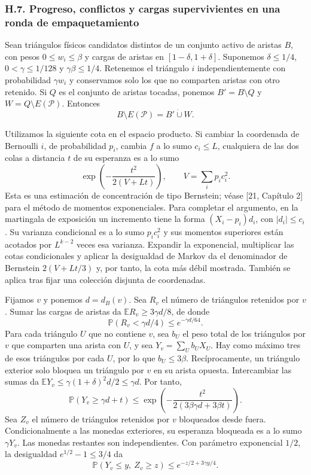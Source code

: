 \documentclass[spanish,11pt,a4paper]{article}
\begin{document}
\subsubsection{H.7. Progreso, conflictos y cargas supervivientes en una ronda de empaquetamiento}\label{h.7.-progreso-conflictos-y-cargas-supervivientes-en-una-ronda-de-empaquetamiento}

Sean triángulos físicos candidatos distintos de un conjunto activo de aristas \(B\), con pesos \(0\le w_i\le\beta\) y cargas de aristas en \([1-\delta,1+\delta]\). Suponemos \(\delta\le1/4\), \(0<\gamma\le1/128\) y \(\gamma\beta\le1/4\). Retenemos el triángulo \(i\) independientemente con probabilidad \(\gamma w_i\) y conservamos solo los que no comparten aristas con otro retenido. Si \(Q\) es el conjunto de aristas tocadas, ponemos \(B'=B\setminus Q\) y \(W=Q\setminus E(\mathcal P)\). Entonces \[B\setminus E(\mathcal P)=B'\mathbin{\dot\cup}W.\]

Utilizamos la siguiente cota en el espacio producto. Si cambiar la coordenada de Bernoulli \(i\), de probabilidad \(p_i\), cambia \(f\) a lo sumo \(c_i\le L\), cualquiera de las dos colas a distancia \(t\) de su esperanza es a lo sumo \[\exp\left(-\frac{t^2}{2(V+Lt)}\right),\qquad V=\sum_i p_ic_i^2.\] Esta es una estimación de concentración de tipo Bernstein; véase {[}21, Capítulo 2{]} para el método de momentos exponenciales. Para completar el argumento, en la martingala de exposición un incremento tiene la forma \((X_i-p_i)d_i\), con \(|d_i|\le c_i\). Su varianza condicional es a lo sumo \(p_ic_i^2\) y sus momentos superiores están acotados por \(L^{k-2}\) veces esa varianza. Expandir la exponencial, multiplicar las cotas condicionales y aplicar la desigualdad de Markov da el denominador de Bernstein \(2(V+Lt/3)\) y, por tanto, la cota más débil mostrada. También se aplica tras fijar una colección disjunta de coordenadas.

Fijamos \(v\) y ponemos \(d=d_B(v)\). Sea \(R_v\) el número de triángulos retenidos por \(v\). Sumar las cargas de aristas da \(\mathbb ER_v\ge3\gamma d/8\), de donde \[\mathbb P(R_v<\gamma d/4)\le e^{-\gamma d/64}.\] Para cada triángulo \(U\) que no contiene \(v\), sea \(b_U\) el peso total de los triángulos por \(v\) que comparten una arista con \(U\), y sea \(Y_v=\sum_U b_UX_U\). Hay como máximo tres de esos triángulos por cada \(U\), por lo que \(b_U\le3\beta\). Recíprocamente, un triángulo exterior solo bloquea un triángulo por \(v\) en su arista opuesta. Intercambiar las sumas da \(\mathbb EY_v\le\gamma(1+\delta)^2d/2\le\gamma d\). Por tanto, \[\mathbb P(Y_v\ge\gamma d+t)
\le\exp\left(-\frac{t^2}{2(3\beta\gamma d+3\beta t)}\right).\] Sea \(Z_v\) el número de triángulos retenidos por \(v\) bloqueados desde fuera. Condicionalmente a las monedas exteriores, su esperanza bloqueada es a lo sumo \(\gamma Y_v\). Las monedas restantes son independientes. Con parámetro exponencial \(1/2\), la desigualdad \(e^{1/2}-1\le3/4\) da \[\mathbb P(Y_v\le y,\ Z_v\ge z)\le e^{-z/2+3\gamma y/4}.\]
\end{document}
